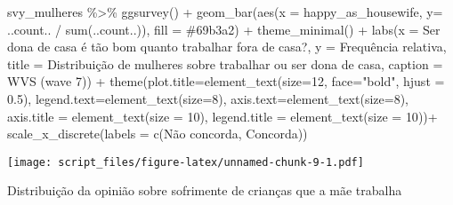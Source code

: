 \documentclass[
]{article}
\newenvironment{Shaded}{\begin{snugshade}}{\end{snugshade}}
\newcommand{\AttributeTok}[1]{\textcolor[rgb]{0.77,0.63,0.00}{#1}}
\newcommand{\DecValTok}[1]{\textcolor[rgb]{0.00,0.00,0.81}{#1}}
\newcommand{\FloatTok}[1]{\textcolor[rgb]{0.00,0.00,0.81}{#1}}
\newcommand{\FunctionTok}[1]{\textcolor[rgb]{0.00,0.00,0.00}{#1}}
\newcommand{\NormalTok}[1]{#1}
\newcommand{\SpecialCharTok}[1]{\textcolor[rgb]{0.00,0.00,0.00}{#1}}
\newcommand{\StringTok}[1]{\textcolor[rgb]{0.31,0.60,0.02}{#1}}
\begin{document}
\begin{Shaded}
\begin{Highlighting}[]
\NormalTok{svy\_mulheres }\SpecialCharTok{\%\textgreater{}\%}
  \FunctionTok{ggsurvey}\NormalTok{() }\SpecialCharTok{+}
  \FunctionTok{geom\_bar}\NormalTok{(}\FunctionTok{aes}\NormalTok{(}\AttributeTok{x =}\NormalTok{ happy\_as\_housewife, }\AttributeTok{y=}\NormalTok{ ..count.. }\SpecialCharTok{/} \FunctionTok{sum}\NormalTok{(..count..)), }\AttributeTok{fill =} \StringTok{\textquotesingle{}\#69b3a2\textquotesingle{}}\NormalTok{) }\SpecialCharTok{+}
  \FunctionTok{theme\_minimal}\NormalTok{() }\SpecialCharTok{+}
  \FunctionTok{labs}\NormalTok{(}\AttributeTok{x =} \StringTok{\textquotesingle{}Ser dona de casa é tão bom quanto trabalhar fora de casa?\textquotesingle{}}\NormalTok{,}
       \AttributeTok{y =} \StringTok{\textquotesingle{}Frequência relativa\textquotesingle{}}\NormalTok{,}
       \AttributeTok{title =} \StringTok{\textquotesingle{}Distribuição de mulheres sobre trabalhar ou ser dona de casa\textquotesingle{}}\NormalTok{,}
       \AttributeTok{caption =} \StringTok{\textquotesingle{}WVS (wave 7)\textquotesingle{}}\NormalTok{) }\SpecialCharTok{+}
  \FunctionTok{theme}\NormalTok{(}\AttributeTok{plot.title=}\FunctionTok{element\_text}\NormalTok{(}\AttributeTok{size=}\DecValTok{12}\NormalTok{, }\AttributeTok{face=}\StringTok{"bold"}\NormalTok{, }\AttributeTok{hjust =} \FloatTok{0.5}\NormalTok{),}
        \AttributeTok{legend.text=}\FunctionTok{element\_text}\NormalTok{(}\AttributeTok{size=}\DecValTok{8}\NormalTok{),}
        \AttributeTok{axis.text=}\FunctionTok{element\_text}\NormalTok{(}\AttributeTok{size=}\DecValTok{8}\NormalTok{),}
        \AttributeTok{axis.title =} \FunctionTok{element\_text}\NormalTok{(}\AttributeTok{size =} \DecValTok{10}\NormalTok{),}
        \AttributeTok{legend.title =} \FunctionTok{element\_text}\NormalTok{(}\AttributeTok{size =} \DecValTok{10}\NormalTok{))}\SpecialCharTok{+}
  \FunctionTok{scale\_x\_discrete}\NormalTok{(}\AttributeTok{labels =} \FunctionTok{c}\NormalTok{(}\StringTok{\textquotesingle{}Não concorda\textquotesingle{}}\NormalTok{, }\StringTok{\textquotesingle{}Concorda\textquotesingle{}}\NormalTok{))}
\end{Highlighting}
\end{Shaded}

\texttt{[image: script\_files/figure-latex/unnamed-chunk-9-1.pdf]}

Distribuição da opinião sobre sofrimente de crianças que a mãe trabalha
\end{document}
